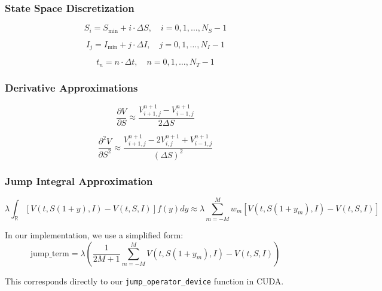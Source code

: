 \documentclass[twocolumn,11pt]{IEEEtran}  %
\begin{document}
\begin{onecolumn}
\subsubsection{State Space Discretization}
\begin{equation}
S_i = S_{\min} + i \cdot \Delta S, \quad i = 0, 1, \ldots, N_S-1
\end{equation}

\begin{equation}
I_j = I_{\min} + j \cdot \Delta I, \quad j = 0, 1, \ldots, N_I-1
\end{equation}

\begin{equation}
t_n = n \cdot \Delta t, \quad n = 0, 1, \ldots, N_T-1
\end{equation}

\subsubsection{Derivative Approximations}
\begin{equation}
\frac{\partial V}{\partial S} \approx \frac{V^{n+1}_{i+1,j} - V^{n+1}_{i-1,j}}{2\Delta S}
\end{equation}

\begin{equation}
\frac{\partial^2 V}{\partial S^2} \approx \frac{V^{n+1}_{i+1,j} - 2V^{n+1}_{i,j} + V^{n+1}_{i-1,j}}{(\Delta S)^2}
\end{equation}

\subsubsection{Jump Integral Approximation}
\begin{equation}
\lambda \int_{\mathbb{R}} \left[V(t, S(1+y), I) - V(t, S, I)\right] f(y) dy \approx \lambda \sum_{m=-M}^{M} w_m \left[V(t, S(1+y_m), I) - V(t, S, I)\right]
\end{equation}

In our implementation, we use a simplified form:
\begin{equation}
\text{jump\_term} = \lambda \left(\frac{1}{2M+1}\sum_{m=-M}^{M} V(t, S(1+y_m), I) - V(t, S, I)\right)
\end{equation}

This corresponds directly to our \texttt{jump\_operator\_device} function in CUDA.


\end{onecolumn}
\end{document}
